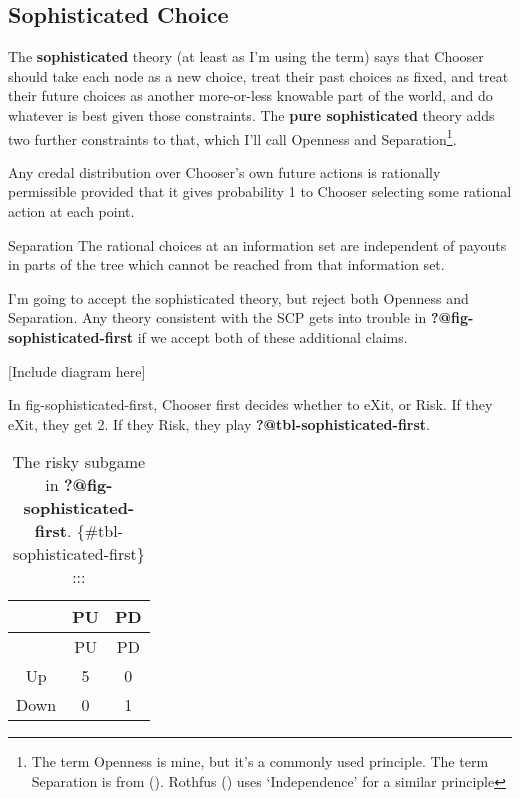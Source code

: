 \documentclass[
  10pt,
  letterpaper,
  DIV=11,
  numbers=noendperiod,
  twoside]{scrartcl}
\providecommand{\tightlist}{%
  \setlength{\itemsep}{0pt}\setlength{\parskip}{0pt}}\usepackage{longtable,booktabs,array}
\begin{document}
\subsection{Sophisticated Choice}\label{sec-sophisticated}

The \textbf{sophisticated} theory (at least as I'm using the term) says
that Chooser should take each node as a new choice, treat their past
choices as fixed, and treat their future choices as another more-or-less
knowable part of the world, and do whatever is best given those
constraints. The \textbf{pure sophisticated} theory adds two further
constraints to that, which I'll call Openness and Separation\footnote{The
  term Openness is mine, but it's a commonly used principle. The term
  Separation is from ().
  Rothfus () uses `Independence'
  for a similar principle}.

\begin{description}
\tightlist
\item[Openness]
Any credal distribution over Chooser's own future actions is rationally
permissible provided that it gives probability 1 to Chooser selecting
some rational action at each point.
\end{description}

Separation The rational choices at an information set are independent of
payouts in parts of the tree which cannot be reached from that
information set.

I'm going to accept the sophisticated theory, but reject both Openness
and Separation. Any theory consistent with the SCP gets into trouble in
\textbf{?@fig-sophisticated-first} if we accept both of these additional
claims.

{[}Include diagram here{]}

In fig-sophisticated-first, Chooser first decides whether to eXit, or
Risk. If they eXit, they get 2. If they Risk, they play
\textbf{?@tbl-sophisticated-first}.

\begin{longtable}[]{@{}ccc@{}}
\caption{The risky subgame in \textbf{?@fig-sophisticated-first}.
\{\#tbl-sophisticated-first\} :::}\tabularnewline
\toprule\noalign{}
& PU & PD \\
\midrule\noalign{}
\endfirsthead
\toprule\noalign{}
& PU & PD \\
\midrule\noalign{}
\endhead
\bottomrule\noalign{}
\endlastfoot
Up & 5 & 0 \\
Down & 0 & 1 \\
\end{longtable}
\end{document}
